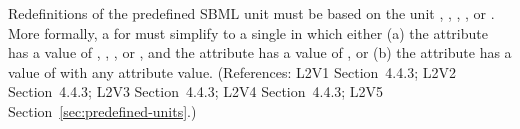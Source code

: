 Redefinitions of the predefined SBML unit  must be based on the
unit , , , , or
.  More formally, a \UnitDefinition for
 must simplify to a single \Unit in which either
(a) the  attribute has a value of ,
, , or , and the 
attribute has a value of , or (b) the  attribute has a
value of  with any  attribute value.
(References: L2V1 Section~4.4.3; L2V2 Section~4.4.3; L2V3
Section~4.4.3; L2V4 Section~4.4.3; L2V5 Section~\ref{sec:predefined-units}.)
